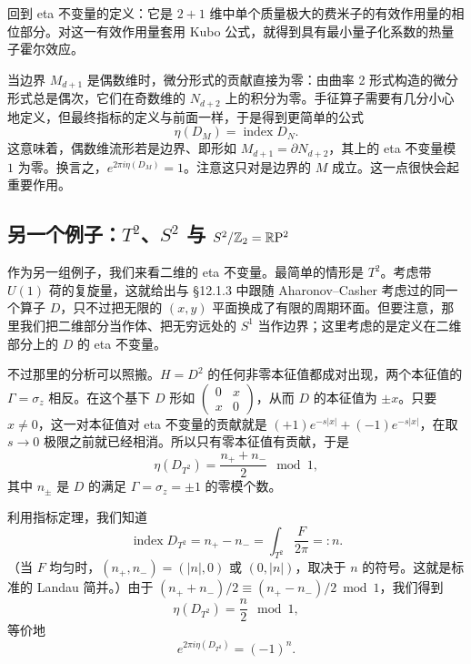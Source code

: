 回到 eta 不变量的定义：它是 $2+1$ 维中单个质量极大的费米子的有效作用量的相位部分。对这一有效作用量套用 Kubo 公式，就得到具有最小量子化系数的热量子霍尔效应。

当边界 $M_{d+1}$ 是偶数维时，微分形式的贡献直接为零：由曲率 2 形式构造的微分形式总是偶次，它们在奇数维的 $N_{d+2}$ 上的积分为零。手征算子需要有几分小心地定义，但最终指标的定义与前面一样，于是得到更简单的公式
\begin{equation}
  \eta(D_M)=\operatorname{index}D_N .
  \tag{12.39}
\end{equation}
这意味着，偶数维流形若是边界、即形如 $M_{d+1}=\partial N_{d+2}$，其上的 eta 不变量模 $1$ 为零。换言之，$e^{2\pi i\eta(D_M)}=1$。注意这只对是边界的 $M$ 成立。这一点很快会起重要作用。

\subsection{另一个例子：$T^2$、$S^2$ 与 $S^2/\mathbb{Z}_2=\mathbb{R}\mathrm{P}^2$}

作为另一组例子，我们来看二维的 eta 不变量。最简单的情形是 $T^2$。考虑带 $U(1)$ 荷的复旋量，这就给出与 §12.1.3 中跟随 Aharonov--Casher 考虑过的同一个算子 $D$，只不过把无限的 $(x,y)$ 平面换成了有限的周期环面。但要注意，那里我们把二维部分当作体、把无穷远处的 $S^1$ 当作边界；这里考虑的是定义在二维部分上的 $D$ 的 eta 不变量。

不过那里的分析可以照搬。$H=D^2$ 的任何非零本征值都成对出现，两个本征值的 $\Gamma=\sigma_z$ 相反。在这个基下 $D$ 形如 $\begin{pmatrix}0&x\\ x&0\end{pmatrix}$，从而 $D$ 的本征值为 $\pm x$。只要 $x\neq0$，这一对本征值对 eta 不变量的贡献就是 $(+1)e^{-s|x|}+(-1)e^{-s|x|}$，在取 $s\to0$ 极限之前就已经相消。所以只有零本征值有贡献，于是
\begin{equation}
  \eta(D_{T^2})=\frac{n_++n_-}{2}\mod 1,
  \tag{12.40}
\end{equation}
其中 $n_\pm$ 是 $D$ 的满足 $\Gamma=\sigma_z=\pm1$ 的零模个数。

利用指标定理，我们知道
\begin{equation}
  \operatorname{index}D_{T^2}=n_+-n_-
  =\int_{T^2}\frac{F}{2\pi}=:n .
  \tag{12.41}
\end{equation}
（当 $F$ 均匀时，$(n_+,n_-)=(|n|,0)$ 或 $(0,|n|)$，取决于 $n$ 的符号。这就是标准的 Landau 简并。）由于 $(n_++n_-)/2\equiv(n_+-n_-)/2\bmod 1$，我们得到
\begin{equation}
  \eta(D_{T^2})=\frac{n}{2}\mod 1,
  \tag{12.42}
\end{equation}
等价地
\begin{equation}
  e^{2\pi i\eta(D_{T^2})}=(-1)^n .
  \tag{12.43}
\end{equation}


